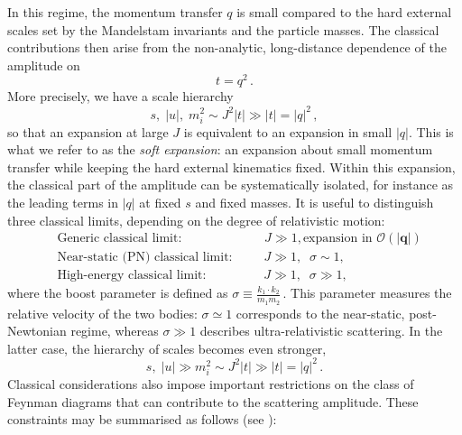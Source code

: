In this regime, the momentum transfer $q$ is small compared to the hard external scales set by the Mandelstam invariants and the particle masses. The classical contributions then arise from the non-analytic, long-distance dependence of the amplitude on
\begin{equation}
t=q^2\, .
\end{equation}
More precisely, we have a scale hierarchy
\begin{equation}
    s,\; |u|,\; m_i^2 \sim J^2 |t| \gg |t| = |q|^2\, ,
\end{equation}
so that an expansion at large $J$ is equivalent to an expansion in small $|q|$. This is what we refer to as the \emph{soft expansion}: an expansion about small momentum transfer while keeping the hard external kinematics fixed. Within this expansion, the classical part of the amplitude can be systematically isolated, for instance as the leading terms in $|q|$ at fixed $s$ and fixed masses. It is useful to distinguish three classical limits, depending on the degree of relativistic motion:
\begin{equation}
\begin{split}
    &\textrm{Generic classical limit:} \qquad\qquad\qquad\;\; J \gg 1, \textrm{expansion in } \mathcal{O}(|\boldsymbol{q}|)\\
    &\textrm{Near-static (PN) classical limit:} \qquad\,\,\, J \gg 1,\;\; \sigma \sim 1,\\
    &\textrm{High-energy classical limit:} \qquad\qquad\;\; J \gg 1,\;\; \sigma \gg 1,
\end{split}
\end{equation}
where the boost parameter is defined as $ \sigma \equiv \frac{k_1\!\cdot\! k_2}{m_1 m_2}\, .$
This parameter measures the relative velocity of the two bodies: $\sigma \simeq 1$ corresponds to the near-static, post-Newtonian regime, whereas $\sigma \gg 1$ describes ultra-relativistic scattering. In the latter case, the hierarchy of scales becomes even stronger,
\begin{equation}
    s,\; |u| \gg m_i^2 \sim J^2 |t| \gg |t| = |q|^2\, .
\end{equation}
Classical considerations also impose important restrictions on the class of Feynman diagrams that can contribute to the scattering amplitude. These constraints may be summarised as follows (see \cite{youtube_484KUavMo0}):
